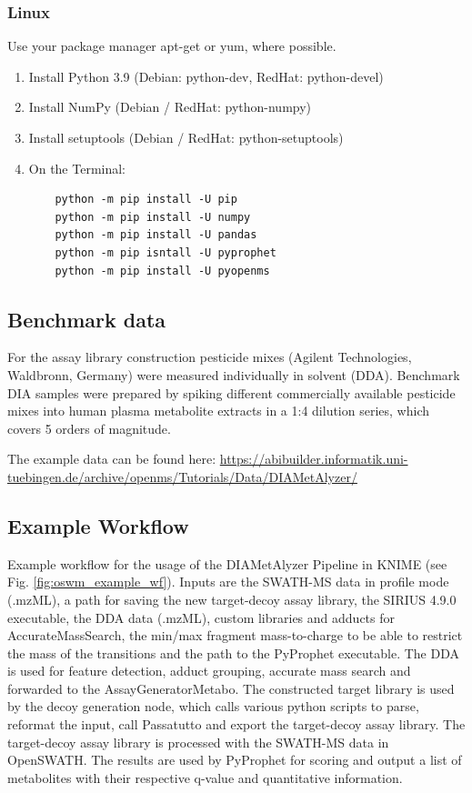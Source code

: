 \subsubsection{Linux}
Use your package manager apt-get or yum, where possible.
\begin{enumerate}
  \item Install Python 3.9 (Debian: python-dev, RedHat: python-devel)
  \item Install NumPy (Debian / RedHat: python-numpy)
  \item Install setuptools (Debian / RedHat: python-setuptools)
  \item On the Terminal:
    \begin{listing}
\begin{verbatim}
    python -m pip install -U pip
    python -m pip install -U numpy
    python -m pip install -U pandas
    python -m pip isntall -U pyprophet
    python -m pip install -U pyopenms
    \end{verbatim}
\end{listing}
\end{enumerate}

\subsection{Benchmark data}
For the assay library construction pesticide mixes (Agilent Technologies, Waldbronn, Germany) were measured individually in solvent (DDA). 
Benchmark DIA samples were prepared by spiking different commercially available pesticide mixes into human plasma metabolite extracts in a 1:4 dilution series, which covers 5 orders of magnitude.

\noindent The example data can be found here:
\url{https://abibuilder.informatik.uni-tuebingen.de/archive/openms/Tutorials/Data/DIAMetAlyzer/}

\subsection{Example Workflow}
Example workflow for the usage of the DIAMetAlyzer Pipeline in KNIME (see Fig. \ref{fig:oswm_example_wf}). Inputs are the SWATH-MS data in profile mode (.mzML), a path for saving the new target-decoy assay library, the SIRIUS 4.9.0 executable, the DDA data (.mzML), custom libraries and adducts for AccurateMassSearch, the min/max fragment mass-to-charge to be able to restrict the mass of the transitions and the path to the PyProphet executable. The DDA is used for feature detection, adduct grouping, accurate mass search and forwarded to the AssayGeneratorMetabo. The constructed target library is used by the decoy generation node, which calls various python scripts to parse, reformat the input, call Passatutto and export the target-decoy assay library. The target-decoy assay library is processed with the SWATH-MS data in OpenSWATH. The results are used by PyProphet for scoring and output a list of metabolites with their respective q-value and quantitative information.

